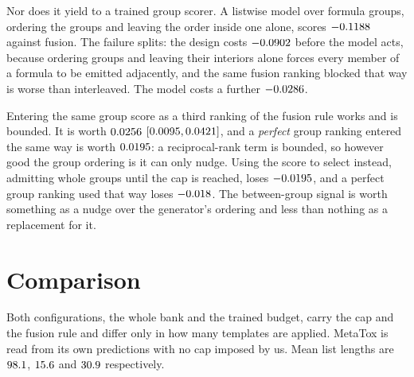 \documentclass[11pt]{article}
\begin{document}
Nor does it yield to a trained group scorer. A listwise model over formula groups, ordering the
groups and leaving the order inside one alone, scores $-0.1188$ against fusion. The failure
splits: the design costs $-0.0902$ before the model acts, because ordering groups and
leaving their interiors alone forces every member of a formula to be emitted adjacently, and the
same fusion ranking blocked that way is worse than interleaved. The model costs a further
$-0.0286$.

Entering the same group score as a third ranking of the fusion rule works and is bounded. It is
worth $0.0256$ $[0.0095, 0.0421]$, and a \emph{perfect} group ranking
entered the same way is worth $0.0195$: a reciprocal-rank term is bounded, so however
good the group ordering is it can only nudge. Using the score to select instead, admitting whole
groups until the cap is reached, loses $-0.0195$, and a perfect group ranking used that
way loses $-0.018$. The between-group signal is worth something as a nudge over the
generator's ordering and less than nothing as a replacement for it.

\section{Comparison}

Both configurations, the whole bank and the trained budget, carry the cap and the fusion rule and
differ only in how many templates are applied. MetaTox is read from its own predictions with no cap
imposed by us. Mean list lengths are $98.1$, $15.6$ and
$30.9$ respectively.
\end{document}
